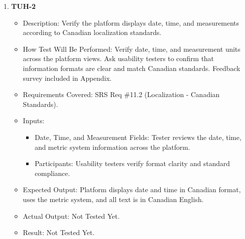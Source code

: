 \documentclass[12pt, titlepage]{article}
\begin{document}
\begin{enumerate}
    \item \textbf{TUH-2}  
    \begin{itemize}
        \item Description: Verify the platform displays date, time, and measurements according to Canadian localization standards.
        \item How Test Will Be Performed: Verify date, time, and measurement units across the platform views. Ask usability testers to confirm that information formats are clear and match Canadian standards. Feedback survey included in Appendix.
        \item Requirements Covered: SRS Req \#11.2 (Localization - Canadian Standards).
        \item Inputs:  
            \begin{itemize}
                \item Date, Time, and Measurement Fields: Tester reviews the date, time, and metric system information across the platform.
                \item Participants: Usability testers verify format clarity and standard compliance.
            \end{itemize}
        \item Expected Output: Platform displays date and time in Canadian format, uses the metric system, and all text is in Canadian English.
        \item Actual Output: Not Tested Yet.
        \item Result: Not Tested Yet.
    \end{itemize}


\end{enumerate}
\end{document}
